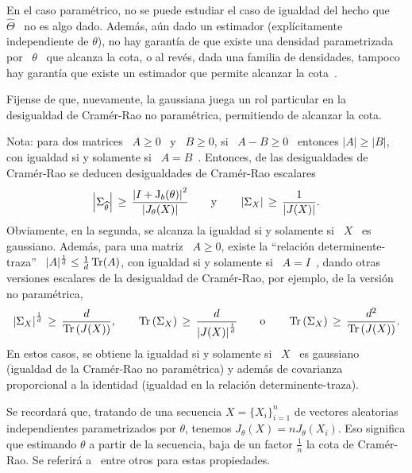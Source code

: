 %
\noindent En el caso param\'etrico, no se puede estudiar el caso de igualdad del
hecho  que \  $\widehat{\Theta}$ \  no es  algo dado.   Adem\'as, a\'un  dado un
estimador (expl\'icitamente independiente de $\theta$), no hay garant\'ia de que
existe una  densidad parametrizada por  \ $\theta$ \  que alcanza la cota,  o al
rev\'es, dada  una familia de densidades,  tampoco hay garant\'ia  que existe un
estimador que permite alcanzar la cota~\cite{CovTho06, Kay93, Bos07}.

Fijense  de  que,  nuevamente,  la  gaussiana  juega un  rol  particular  en  la
desigualdad de Cram\'er-Rao no param\'etrica, permitiendo de alcanzar la cota.

Nota: para  dos matrices \  $A \ge 0$  \ y \  $B \ge 0$,  si \ $A  - B \ge  0$ \
entonces $|A| \ge  |B|$, con igualdad si y solamente si  \ $A = B$~\cite[cap.~1,
teorema~25]{MagNeu99}.   Entonces,  de  las  desigualdades  de  Cram\'er-Rao  se
deducen desigualdades de Cram\'er-Rao escalares
%
\[
\left|   \Sigma_{\widehat{\theta}}  \right|   \,   \ge  \,   \frac{\left|  I   +
    \operatorname{J}_b(\theta) \right|^2}{\left| J_\theta(X) \right|} \qquad \mbox{y} \qquad
\left| \Sigma_X \right| \, \ge \, \frac{1}{\left| J(X) \right|}.
\]
%
Obviamente, en la segunda,  se alcanza la igualdad si y solamente  si \ $X$ \ es
gaussiano.   Adem\'as, para  una  matriz \  $A  \ge 0$,  existe la  ``relaci\'on
determinente-traza''  \ $|A|^{\frac1d} \le  \frac1d \operatorname{Tr}(A)$,  con igualdad  si y
solamente si  \ $A = I$~\cite[cap.~11, sec.~4]{MagNeu99},  dando otras versiones
escalares de  la desigualdad  de Cram\'er-Rao, por  ejemplo, de la  versi\'on no
param\'etrica,
%
\[
\left| \Sigma_X  \right|^{\frac1d} \,  \ge \, \frac{d}{\operatorname{Tr}\left(  J(X) \right)},
\qquad   \operatorname{Tr}\left(   \Sigma_X   \right)   \,   \ge   \,   \frac{d}{\left|   J(X)
  \right|^{\frac1d}} \qquad \mbox{o} \qquad \operatorname{Tr}\left( \Sigma_X \right) \, \ge \,
\frac{d^2}{\operatorname{Tr}\left( J(X) \right)}.
\]
%
En estos casos,  se obtiene la igualdad si  y solamente si \ $X$  \ es gaussiano
(igualdad  de  la  Cram\'er-Rao  no  param\'etrica)  y  adem\'as  de  covarianza
proporcional a la identidad (igualdad en la relaci\'on determinente-traza).


Se  recordar\'a que,  tratando  de una  secuencia  $X =  \{  X_i \}_{i=1}^n$  de
vectores   aleatorias  independientes   parametrizados  por   $\theta$,  tenemos
$J_\theta(X) = n  J_\theta(X_i)$. Eso significa que estimando  $\theta$ a partir
de la  secuencia, baja de un  factor $\frac{1}{n}$ la cota  de Cram\'er-Rao.  Se
referir\'a  a~\cite{Fis25:07, Sta59,  Kay93, KagSmi99,  Joh04, CovTho06,  Rio07}
entre otros para estas propiedades.


